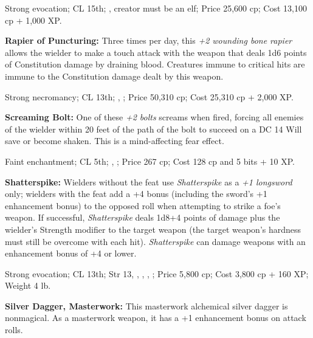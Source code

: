 Strong evocation; CL 15th; , creator must be an elf; Price 25,600 cp; Cost 13,100 cp + 1,000 XP.

\textbf{Rapier of Puncturing:} Three times per day, this \emph{+2 wounding bone rapier} allows the wielder to make a touch attack with the weapon that deals 1d6 points of Constitution damage by draining blood. Creatures immune to critical hits are immune to the Constitution damage dealt by this weapon.

Strong necromancy; CL 13th; , ; Price 50,310 cp; Cost 25,310 cp + 2,000 XP.

\textbf{Screaming Bolt:} One of these \emph{+2 bolts} screams when fired, forcing all enemies of the wielder within 20 feet of the path of the bolt to succeed on a DC 14 Will save or become shaken. This is a mind-affecting fear effect.

Faint enchantment; CL 5th; , ; Price 267 cp; Cost 128 cp and 5 bits + 10 XP.

\textbf{Shatterspike:} Wielders without the  feat use \emph{Shatterspike} as a \emph{+1 longsword} only; wielders with the  feat add a +4 bonus (including the sword's +1 enhancement bonus) to the opposed roll when attempting to strike a foe's weapon. If successful, \emph{Shatterspike} deals 1d8+4 points of damage plus the wielder's Strength modifier to the target weapon (the target weapon's hardness must still be overcome with each hit). \emph{Shatterspike} can damage weapons with an enhancement bonus of +4 or lower.

Strong evocation; CL 13th; Str 13, , , , ; Price 5,800 cp; Cost 3,800 cp + 160 XP; Weight 4 lb.



\textbf{Silver Dagger, Masterwork:} This masterwork alchemical silver dagger is nonmagical. As a masterwork weapon, it has a +1 enhancement bonus on attack rolls.

